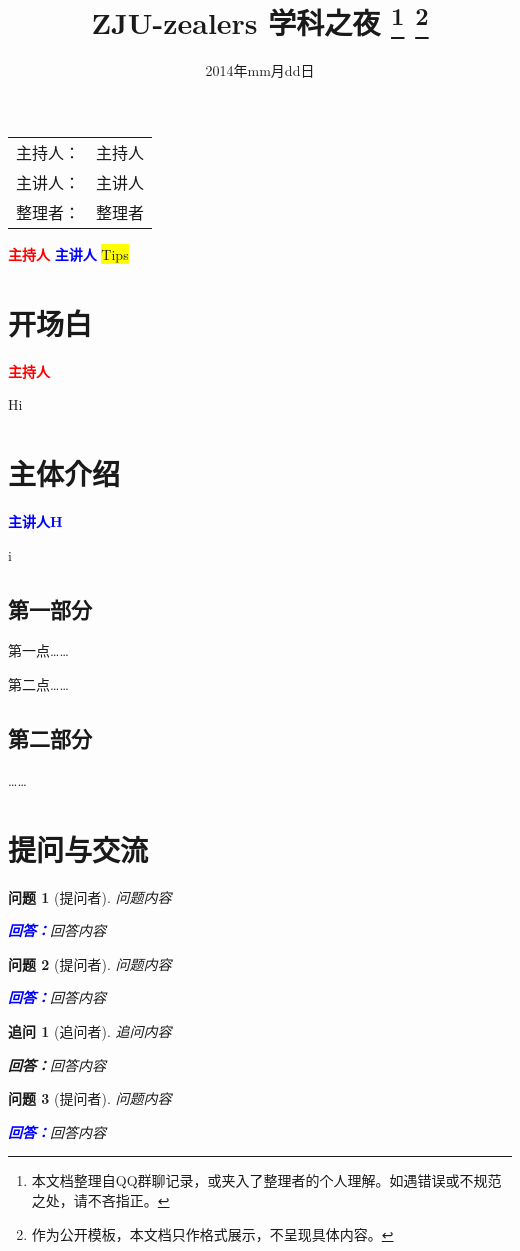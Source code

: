 \documentclass[a4paper,12pt]{ctexart}
\title{\textbf{ZJU-zealers 学科之夜}%
	\footnote{本文档整理自QQ群聊记录，或夹入了整理者的个人理解。如遇错误或不规范之处，请不吝指正。}
	\footnote{作为公开模板，本文档只作格式展示，不呈现具体内容。}
}
\author{}
\date{2014年mm月dd日}
\theoremstyle{Question}
\newtheorem{question}{\color{magenta}问题}
\theoremstyle{postQuestion}
\newtheorem*{postquestion}{\color{magenta!50}追问}
\newcommand{\answer}{\par\noindent\textbf{\textcolor{blue}{回答：}}\normalfont\songti}
\newcommand{\postanswer}{\par\textbf{\textcolor{blue!50}{回答：}}\rmfamily\songti}
\newcommand\host[1][主持人]{\textcolor{red}{\bf#1}\par}
\newcommand\lecturer[2][主讲人]{\textcolor{blue}{\bf#1\quad#2}\par}
\newcommand{\info}[3]{\begin{table}[h]
  \centering
  \begin{tabu}{>{\heiti}X[2,r]>{\kaishu}X[3]}
  	主持人： & #1  \\
  	主讲人： & #2  \\
  	整理者： & #3
  \end{tabu}
\end{table}
}
\begin{document}
\maketitle
\info{主持人} %
	 {主讲人} %
	 {整理者} %
	 
\begin{center}
	\textcolor{red}{\textbf{主持人}} \quad \textcolor{blue}{\textbf{主讲人}} \quad \colorbox{yellow}{Tips}
\end{center}

\tableofcontents

\section{开场白}
\host
Hi

\section{主体介绍}
\lecturer
Hi

\subsection{第一部分}
第一点……

第二点……

\subsection{第二部分}
……


\section{提问与交流}
\begin{question}[提问者]
  问题内容
  
  \answer  回答内容
\end{question}

\begin{question}[提问者]
  问题内容
  
  \answer  回答内容
\end{question}

\begin{postquestion}[追问者]
  追问内容
  
  \postanswer 回答内容
\end{postquestion}

\begin{question}[提问者]
  问题内容
  
  \answer  回答内容
\end{question}
\end{document}

